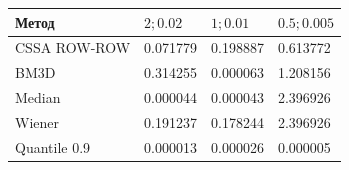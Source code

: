 \begin{tabular}{|l|l|l|l|}
\hline
Метод & $2; 0.02$ & $1; 0.01$ & $0.5; 0.005$ \\
\hline
CSSA ROW-ROW & 0.071779 & 0.198887 & 0.613772 \\
\hline
BM3D & 0.314255 & 0.000063 & 1.208156 \\
\hline
Median & 0.000044 & 0.000043 & 2.396926 \\
\hline
Wiener & 0.191237 & 0.178244 & 2.396926 \\
\hline
Quantile 0.9 & 0.000013 & 0.000026 & 0.000005 \\
\hline
\end{tabular}

